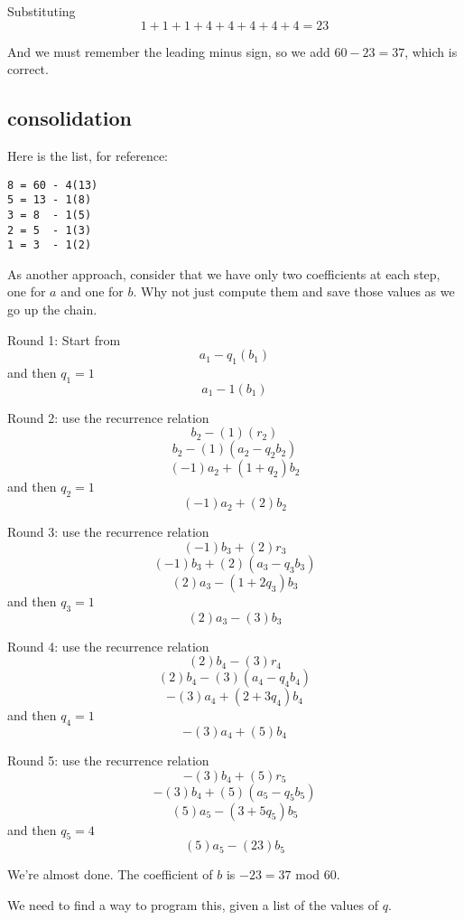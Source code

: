 \documentclass[11pt, oneside]{article}   	%
\begin{document}
Substituting
\[ 1 + 1 + 1 + 4 + 4 + 4 + 4 + 4 = 23 \]

And we must remember the leading minus sign, so we add $60 - 23 = 37$, which is correct.

\subsection*{consolidation}
Here is the list, for reference:
\begin{verbatim}
8 = 60 - 4(13)
5 = 13 - 1(8)
3 = 8  - 1(5)
2 = 5  - 1(3)
1 = 3  - 1(2)
\end{verbatim}

As another approach, consider that we have only two coefficients at each step, one for $a$ and one for $b$.  Why not just compute them and save those values as we go up the chain.

Round 1:  Start from
\[ a_1 - q_1(b_1)  \]
and then $q_1 = 1$
\[ a_1 - 1(b_1)  \]

Round 2:  use the recurrence relation
\[ b_2 - (1)(r_2)  \]
\[ b_2 - (1)(a_2 - q_2 b_2) \]
\[ (-1) a_2 + (1 + q_2 ) b_2 \]
and then $q_2 = 1$
\[ (-1) a_2 + (2) b_2 \]

Round 3:  use the recurrence relation
\[ (-1) b_3 + (2) r_3 \]
\[ (-1) b_3 + (2)(a_3 - q_3 b_3) \]
\[ (2)a_3 - (1 + 2q_3 )b_3 \]
 and then $q_3 = 1$
\[ (2)a_3 - (3)b_3 \]

Round 4:  use the recurrence relation
\[ (2)b_4 - (3)r_4 \]
\[ (2)b_4 - (3)(a_4 - q_4 b_4) \]
\[ -(3) a_4 + (2 + 3q_4) b_4 \]
and then $q_4 = 1$
\[ -(3) a_4 + (5) b_4 \]

Round 5:  use the recurrence relation
\[ -(3) b_4 + (5) r_5 \]
\[ -(3) b_4 + (5) (a_5 - q_5 b_5) \]
\[ (5) a_5 - (3 + 5q_5) b_5 \]
and then $q_5 = 4$
\[ (5) a_5 - (23) b_5 \]

We're almost done.  The coefficient of $b$ is $-23 = 37$ mod $60$.

We need to find a way to program this, given a list of the values of $q$.
\end{document}
